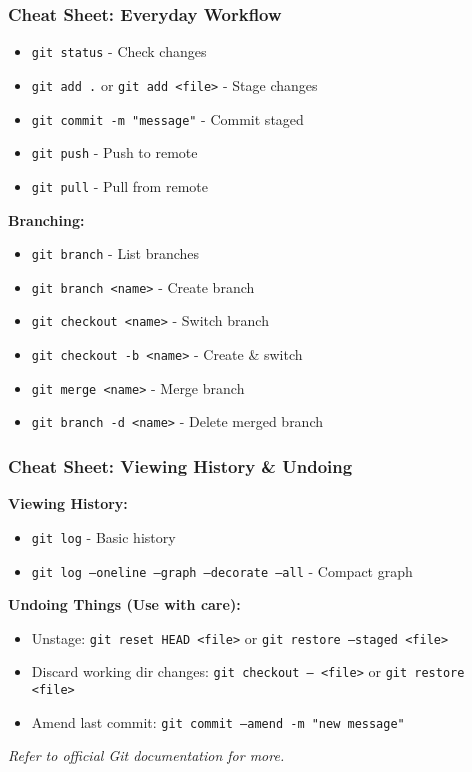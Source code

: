 \documentclass{beamer}
\begin{document}
\begin{frame}[fragile]
  \frametitle{Cheat Sheet: Everyday Workflow}
  \begin{itemize}
    \item \texttt{git status} - Check changes
    \item \texttt{git add .} or \texttt{git add <file>} - Stage changes
    \item \texttt{git commit -m "message"} - Commit staged
    \item \texttt{git push} - Push to remote
    \item \texttt{git pull} - Pull from remote
  \end{itemize}
  \pause
  \textbf{Branching:}
  \begin{itemize}
    \item \texttt{git branch} - List branches
    \item \texttt{git branch <name>} - Create branch
    \item \texttt{git checkout <name>} - Switch branch
    \item \texttt{git checkout -b <name>} - Create \& switch
    \item \texttt{git merge <name>} - Merge branch
    \item \texttt{git branch -d <name>} - Delete merged branch
  \end{itemize}
\end{frame}

\begin{frame}[fragile]
  \frametitle{Cheat Sheet: Viewing History \& Undoing}
  \textbf{Viewing History:}
  \begin{itemize}
    \item \texttt{git log} - Basic history
    \item \texttt{git log --oneline --graph --decorate --all} - Compact graph
  \end{itemize}
  \pause
  \textbf{Undoing Things (Use with care):}
  \begin{itemize}
    \item Unstage: \texttt{git reset HEAD <file>} or \texttt{git restore --staged <file>}
    \item Discard working dir changes: \texttt{git checkout -- <file>} or \texttt{git restore <file>}
    \item Amend last commit: \texttt{git commit --amend -m "new message"}
  \end{itemize}
  \textit{Refer to official Git documentation for more.}
\end{frame}
\end{document}
